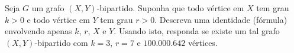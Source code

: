 Seja $G$ um grafo $(X,Y)$-bipartido. Suponha que todo vértice em $X$ tem grau $k > 0$ e todo vértice em $Y$ tem grau $r > 0$. Descreva uma identidade (fórmula) envolvendo apenas $k$, $r$, $X$ e $Y$. Usando isto, responda se existe um tal grafo $(X,Y)$-bipartido com $k = 3$, $r = 7$ e $100.000.642$ vértices.

\itemdsep
